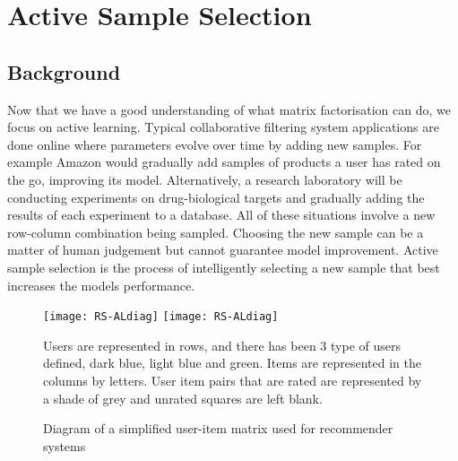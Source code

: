 \chapter{Active Sample Selection}
\ifpdf
    \graphicspath{{Chapter2/Chapter2Figs/PNG/}{Chapter2/Chapter2Figs/PDF/}{Chapter2/Chapter2Figs/}}
\else
    \graphicspath{{Chapter2/Chapter2Figs/EPS/}{Chapter2/Chapter2Figs/}}
\fi
{}
\section{Background}

Now that we have a good understanding of what matrix factorisation can do, we focus on active learning. Typical collaborative filtering system applications are done online where parameters evolve over time by adding new samples. For example Amazon would gradually add samples of products a user has rated on the go, improving its model. Alternatively, a research laboratory will be conducting experiments on drug-biological targets and gradually adding the results of each experiment to a database. All of these situations involve a new row-column combination being sampled. Choosing the new sample can be a matter of human judgement but cannot guarantee model improvement. Active sample selection is the process of intelligently selecting a new sample that best increases the models performance.

\begin{figure}[H]
  \begin{center}
    \leavevmode
    \ifpdf
      \texttt{[image: RS-ALdiag]}
    \else
      \texttt{[image: RS-ALdiag]}
    \fi
    \end{center}
Users are represented in rows, and there has been 3 type of users deﬁned, dark blue, light blue and green. Items are represented in the columns by letters. User item pairs that are rated are represented by a shade of grey and unrated squares are left blank.
    \caption{Diagram of a simpliﬁed user-item matrix used for recommender systems}
    \label{fig:al-diag}
\end{figure}

